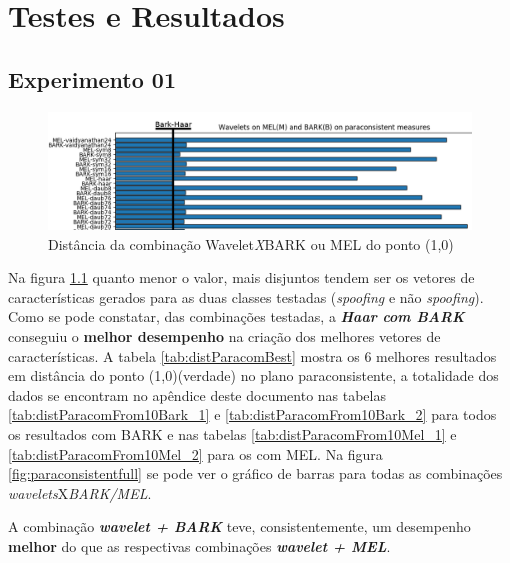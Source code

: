 \chapter{Testes e Resultados} \label{chap:testsResults}
	\section{Experimento 01}
	\begin{figure}[h]
		\centering
		\includegraphics[width=\linewidth]{images/results/paraconsistentPlane/ParaconsistentParcial.png}
		\caption{Distância da combinação Wavelet\textit{X}BARK ou MEL do ponto (1,0)}
		\label{fig:ParaconsistentParcial}
	\end{figure}

	

	\par Na figura \ref{fig:ParaconsistentParcial} quanto menor o valor, mais disjuntos tendem ser os vetores de características gerados para as duas classes testadas (\textit{spoofing }e não \textit{spoofing}). Como se pode constatar, das combinações testadas, a \textit{\textbf{Haar com BARK}} conseguiu o \textbf{melhor desempenho} na criação dos melhores vetores de características. A tabela \ref{tab:distParacomBest} mostra os 6 melhores resultados em distância do ponto (1,0)(verdade) no plano paraconsistente, a totalidade dos dados se encontram no apêndice deste documento nas tabelas \ref{tab:distParacomFrom10Bark_1} e \ref{tab:distParacomFrom10Bark_2} para todos os resultados com BARK e nas tabelas \ref{tab:distParacomFrom10Mel_1} e \ref{tab:distParacomFrom10Mel_2} para os com MEL. Na figura \ref{fig:paraconsistentfull} se pode ver o gráfico de barras para todas as combinações \textit{wavelets}X\textit{BARK/MEL}.
	
	\par A combinação \textbf{\textit{wavelet + BARK}} teve, consistentemente, um desempenho \textbf{melhor} do que as respectivas combinações \textbf{\textit{wavelet + MEL}}.
	
	\newpage

